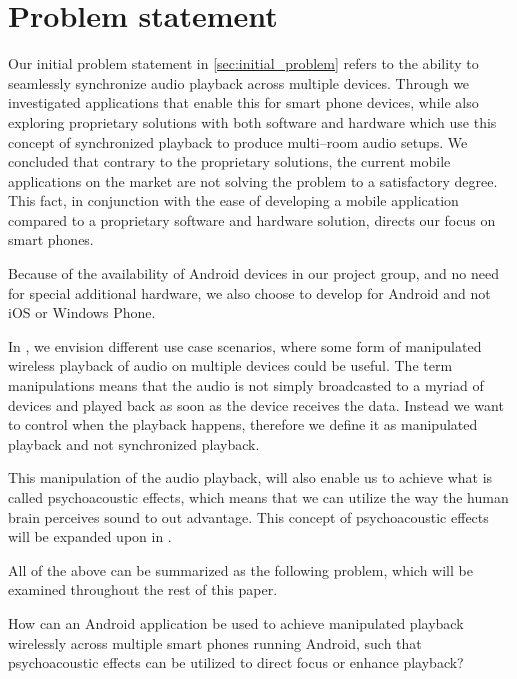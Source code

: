 \chapter{Problem statement}\label{cha:problem_statement}
Our initial problem statement in \cref{sec:initial_problem} refers to the ability to seamlessly synchronize audio playback across multiple devices.
Through  we investigated applications that enable this for smart phone devices, while also exploring proprietary solutions with both software and hardware which use this concept of synchronized playback to produce multi--room audio setups. 
We concluded that contrary to the proprietary solutions, the current mobile applications on the market are not solving the problem to a satisfactory degree.
This fact, in conjunction with the ease of developing a mobile application compared to a proprietary software and hardware solution, directs our focus on smart phones.

Because of the availability of Android devices in our project group, and no need for special additional hardware, we also choose to develop for Android and not iOS or Windows Phone.

\bigskip
In , we envision different use case scenarios, where some form of manipulated wireless playback of audio on multiple devices could be useful.
The term manipulations means that the audio is not simply broadcasted to a myriad of devices and played back as soon as the device receives the data.
Instead we want to control when the playback happens, therefore we define it as manipulated playback and not synchronized playback.

This manipulation of the audio playback, will also enable us to achieve what is called psychoacoustic effects, which means that we can utilize the way the human brain perceives sound to out advantage.
This concept of psychoacoustic effects will be expanded upon in .

\bigskip
All of the above can be summarized as the following problem, which will be examined throughout the rest of this paper.

\begin{problemstatement}
    How can an Android application be used to achieve manipulated playback wirelessly across multiple smart phones running Android, such that psychoacoustic effects can be utilized to direct focus or enhance playback?
\end{problemstatement}
